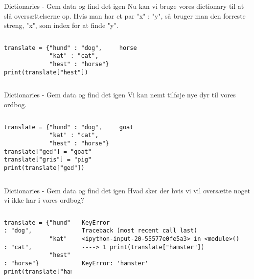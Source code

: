 \documentclass[main.tex]{subfiles}
\begin{document}
\begin{frame}[fragile]{Dictionaries - Gem data og find det igen}
	Nu kan vi bruge vores dictionary til at slå oversættelserne op. Hvis man har et par "x" : "y", så bruger man den forreste streng, "x", som index for at finde "y".
	\begin{columns}
		\begin{lstlisting}[style=python]
translate = {"hund" : "dog", 
             "kat" : "cat", 
             "hest" : "horse"}
print(translate["hest"])
		\end{lstlisting}
	
		\pause
		\begin{lstlisting}[style=python]
horse
		\end{lstlisting}
	\end{columns}	
\end{frame}

\begin{frame}[fragile]{Dictionaries - Gem data og find det igen}
	Vi kan nemt tilføje nye dyr til vores ordbog.
	\begin{columns}
		\column{0.5\textwidth}
		\begin{lstlisting}[style=python]
translate = {"hund" : "dog", 
		     "kat" : "cat", 
		     "hest" : "horse"}
translate["ged"] = "goat"
translate["gris"] = "pig"
print(translate["ged"])
		\end{lstlisting}
		
		\pause
		\column{0.3\textwidth}
		\begin{lstlisting}[style=python]
goat
		\end{lstlisting}
	\end{columns}	
\end{frame}

\begin{frame}[fragile]{Dictionaries - Gem data og find det igen}
Hvad sker der hvis vi vil oversætte noget vi ikke har i vores ordbog?
\begin{columns}
	\begin{lstlisting}[style=python]
translate = {"hund" : "dog", 
             "kat" : "cat", 
             "hest" : "horse"}
print(translate["hamster"])
	\end{lstlisting}
	
	\pause
	\column{0.4\textwidth}
	\begin{lstlisting}[style=python]
KeyError                                  Traceback (most recent call last)
<ipython-input-20-55577e0fe5a3> in <module>()
----> 1 print(translate["hamster"])

KeyError: 'hamster'
	\end{lstlisting}
\end{columns}	
\end{frame}
\end{document}
